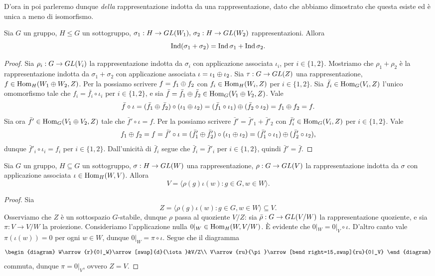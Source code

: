 D'ora in poi parleremo dunque \emph{della} rappresentazione indotta da una rappresentazione, dato che abbiamo dimostrato che questa esiste ed è unica a meno di isomorfismo.

\begin{proposition}
Sia $G$ un gruppo, $H\le G$ un sottogruppo, $\sigma_1:H\to GL(W_1),\,\allowbreak\sigma_2:H\to GL(W_2)$ rappresentazioni. Allora
$$
\operatorname{Ind}(\sigma_1+\sigma_2)=\operatorname{Ind}\sigma_1+\operatorname{Ind}\sigma_2.
$$
\end{proposition}
\begin{proof}
Sia $\rho_i:G\to GL(V_i)$ la rappresentazione indotta da $\sigma_i$ con applicazione associata $\iota_i$, per $i\in\{1,2\}$. Mostriamo che $\rho_1+\rho_2$ è la rappresentazione indotta da $\sigma_1+\sigma_2$ con applicazione associata $\iota=\iota_1\oplus\iota_2$. Sia $\tau:G\to GL(Z)$ una rappresentazione, $f\in\operatorname{Hom}_H(W_1\oplus W_2,Z)$. Per la  possiamo scrivere $f=f_1\oplus f_2$ con $f_i\in\operatorname{Hom}_H(W_i,Z)$ per $i\in\{1,2\}$. Sia $\bar{f}_i\in\operatorname{Hom}_G(V_i,Z)$ l'unico omomorfismo tale che $f_i=\bar{f_i}\circ\iota_i$ per $i\in\{1,2\}$, e sia $\bar{f}=\bar{f}_1\oplus\bar{f}_2\in\operatorname{Hom}_G(V_1\oplus V_2,Z)$. Vale
$$
\bar{f}\circ\iota=(\bar{f}_1\oplus\bar{f}_2)\circ(\iota_1\oplus\iota_2)=(\bar{f}_1\circ\iota_1)\oplus(\bar{f}_2\circ\iota_2)=f_1\oplus f_2=f.
$$
Sia ora $\bar{f}'\in\operatorname{Hom}_G(V_1\oplus V_2,Z)$ tale che $\bar{f}'\circ\iota=f$. Per la  possiamo scrivere $\bar{f}'=\bar{f}'_1+\bar{f}'_2$ con $\bar{f}'_i\in\operatorname{Hom}_G(V_i,Z)$ per $i\in\{1,2\}$. Vale
$$
f_1\oplus f_2=f=\bar{f}'\circ\iota=(\bar{f}'_1\oplus\bar{f}'_2)\circ(\iota_1\oplus\iota_2)=(\bar{f}'_1\circ\iota_1)\oplus(\bar{f}'_2\circ\iota_2),
$$
dunque $\bar{f}'_i\circ\iota_i=f_i$ per $i\in\{1,2\}$. Dall'unicità di $\bar{f}_i$ segue che $\bar{f}_i=\bar{f}'_i$ per $i\in\{1,2\}$, quindi $\bar{f}'=\bar{f}$.
\end{proof}

\begin{proposition}
Sia $G$ un gruppo, $H\subseteq G$ un sottogruppo, $\sigma:H\to GL(W)$ una rappresentazione, $\rho:G\to GL(V)$ la rappresentazione indotta da $\sigma$ con applicazione associata $\iota\in\operatorname{Hom}_H(W,V)$. Allora
$$
V=\langle\rho(g)\iota(w):g\in G,w\in W\rangle.
$$
\end{proposition}
\begin{proof}
Sia 
$$
Z=\langle\rho(g)\iota(w):g\in G,w\in W\rangle\subseteq V.
$$
Osserviamo che $Z$ è un sottospazio $G$-stabile, dunque $\rho$ passa al quoziente $V/Z$: sia $\bar\rho:G\to GL(V/W)$ la rappresentazione quoziente, e sia $\pi:V\to V/W$ la proiezione. Consideriamo l'applicazione nulla $0|_W\in\operatorname{Hom}_H(W,V/W)$. È evidente che $0|_W=0|_V\circ\iota$. D'altro canto vale $\pi(\iota(w))=0$ per ogni $w\in W$, dunque $0|_W=\pi\circ\iota$. Segue che il diagramma
$$
\begin{diagram}
W\arrow{r}{0|_W}\arrow[swap]{d}{\iota}&V/Z\\
V\arrow{ru}{\pi}\arrow[bend right=15,swap]{ru}{0|_V}
\end{diagram}
$$
commuta, dunque $\pi=0|_V$, ovvero $Z=V$.
\end{proof}

